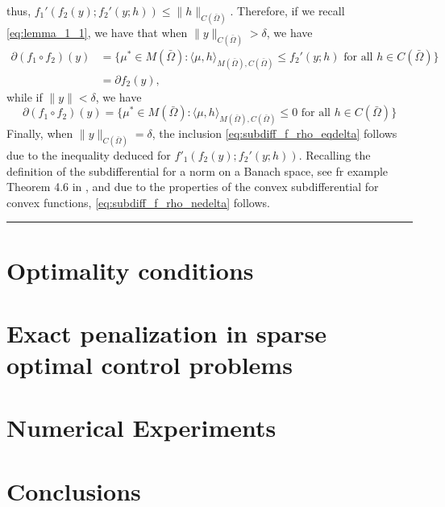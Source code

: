 \documentclass[11pt,a4paper]{amsart}
\newcommand{\kw}{\rule{2mm}{2mm}}
\newcommand{\om}{\Omega}
\renewenvironment{proof}{{Proof.}}{\hfill\kw}
\newcommand{\norm}[1]{\lVert #1 \rVert}
\begin{document}
\begin{proof}
\[    \]
thus, $f_1'(f_2(y);f_2'(y;h))\le \norm{h}_{C(\bar\om)}$. Therefore, if we recall \eqref{eq:lemma_1_1}, we have that when $\norm{y}_{C(\bar \om)}>\delta$, we have
\begin{align*}
    \partial (f_1\circ f_2)(y)
    &=\{\mu^*\in M(\bar\om):\langle \mu, h \rangle_{M(\bar \om),C(\bar\om)}\le f_2'(y;h) \mbox{ for all }h\in C(\bar \om)\}\\
    &=\partial f_2(y),
\end{align*}
while if $\norm{y}<\delta$, we have
\[
    \partial (f_1\circ f_2)(y)
    =\{\mu^*\in M(\bar\om):\langle \mu, h \rangle_{M(\bar \om),C(\bar\om)}\le 0 \mbox{ for all }h\in C(\bar \om)\}
\]
Finally, when $\norm{y}_{C(\bar\om)}=\delta$, the inclusion \eqref{eq:subdiff_f_rho_eqdelta} follows due to the inequality deduced for $f'_1(f_2(y);f_2'(y;h))$. Recalling the definition of the subdifferential for a norm on a Banach space, see fr example Theorem 4.6 in \cite{clason-valk}, and due to the properties of the convex subdifferential for convex functions, \eqref{eq:subdiff_f_rho_nedelta} follows.
\end{proof}


\section{Optimality conditions}

\section{Exact penalization in sparse optimal control problems}

\section{Numerical Experiments}

\section{Conclusions}
\end{document}
